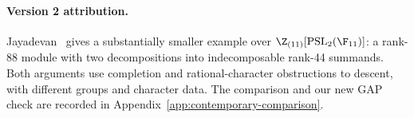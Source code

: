 
\paragraph{Version 2 attribution.}
Jayadevan~\cite{jayadevan-4-55} gives a substantially smaller example
over \(\Z_{(11)}[\operatorname{PSL}_2(\F_{11})]\): a rank-88 module
with two decompositions into indecomposable rank-44 summands. Both
arguments use completion and rational-character obstructions to descent,
with different groups and character data. The comparison and our new
GAP check are recorded in Appendix~\ref{app:contemporary-comparison}.
